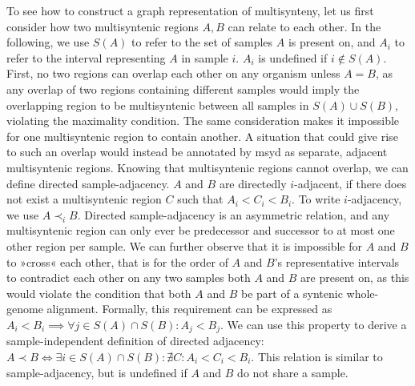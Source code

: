 To see how to construct a graph representation of multisynteny, let us first consider how two multisyntenic regions $A, B$ can relate to each other.
In the following, we use $S(A)$ to refer to the set of samples $A$ is present on, and $A_i$ to refer to the interval representing $A$ in sample $i$.
$A_i$ is undefined if $i \notin S(A)$.\\
First, no two regions can overlap each other on any organism unless $A=B$, as any overlap of two regions containing different samples would imply the overlapping region to be multisyntenic between all samples in $S(A) \cup S(B)$, violating the maximality condition.
The same consideration makes it impossible for one multisyntenic region to contain another.
A situation that could give rise to such an overlap would instead be annotated by msyd as separate, adjacent multisyntenic regions. %
Knowing that multisyntenic regions cannot overlap, we can define directed sample-adjacency.
$A$ and $B$ are directedly $i$-adjacent, if there does not exist a multisyntenic region $C$ such that $A_i < C_i < B_i$.
To write $i$-adjacency, we use $A \prec_i B$.
Directed sample-adjacency is an asymmetric relation, and any multisyntenic region can only ever be predecessor and successor to at most one other region per sample.
We can further observe that it is impossible for $A$ and $B$ to »cross« each other, that is for the order of $A$ and $B$'s representative intervals to contradict each other on any two samples both $A$ and $B$ are present on, as this would violate the condition that both $A$ and $B$ be part of a syntenic whole-genome alignment.
Formally, this requirement can be expressed as $A_i < B_i \implies \forall j \in S(A) \cap S(B): A_j < B_j$.
We can use this property to derive a sample-independent definition of directed adjacency: $A \prec B \iff \exists i \in S(A) \cap S(B): \nexists C: A_i < C_i < B_i$.
This relation is similar to sample-adjacency, but is undefined if $A$ and $B$ do not share a sample.

